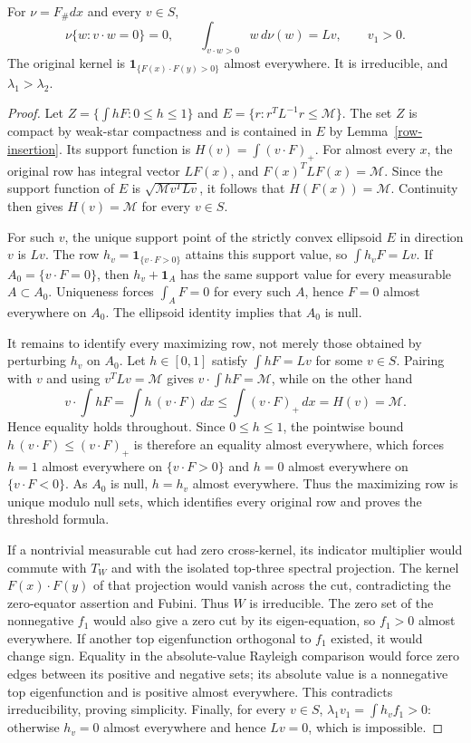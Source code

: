 \begin{lemma}\label{contact-structure}
For $\nu=F_\#dx$ and every $v\in S$,
\begin{equation}\label{all-rows}
 \nu\{w:v\cdot w=0\}=0,\qquad
 \int_{v\cdot w>0}w\,d\nu(w)=Lv,\qquad v_1>0.
\end{equation}
The original kernel is $\mathbf1_{\{F(x)\cdot F(y)>0\}}$ almost
everywhere. It is irreducible, and $\lambda_1>\lambda_2$.
\end{lemma}
\begin{proof}
Let $Z=\{\int hF:0\le h\le1\}$ and
$E=\{r:r^TL^{-1}r\le\mathcal M\}$. The set $Z$ is compact by weak-star
compactness and is contained in $E$ by Lemma~\ref{row-insertion}.
Its support function is $H(v)=\int(v\cdot F)_+$.
For almost every $x$, the original row has integral vector $LF(x)$,
and $F(x)^TLF(x)=\mathcal M$. Since the support function of $E$ is
$\sqrt{\mathcal M v^TLv}$, it follows that $H(F(x))=\mathcal M$.
Continuity then gives $H(v)=\mathcal M$ for every $v\in S$.

For such $v$, the unique support point of the strictly convex ellipsoid
$E$ in direction $v$ is $Lv$. The row $h_v=\mathbf1_{\{v\cdot F>0\}}$
attains this support value, so $\int h_vF=Lv$. If
$A_0=\{v\cdot F=0\}$, then $h_v+\mathbf1_A$ has the same support value
for every measurable $A\subset A_0$. Uniqueness forces $\int_A F=0$
for every such $A$, hence $F=0$ almost everywhere on $A_0$.
The ellipsoid identity implies that $A_0$ is null.

It remains to identify every maximizing row, not merely those obtained by
perturbing $h_v$ on $A_0$. Let $h\in[0,1]$ satisfy $\int hF=Lv$ for some
$v\in S$. Pairing with $v$ and using $v^TLv=\mathcal M$ gives
$v\cdot\int hF=\mathcal M$, while on the other hand
\[
 v\cdot\int hF=\int h\,(v\cdot F)\,dx\le\int(v\cdot F)_+\,dx=H(v)=\mathcal M .
\]
Hence equality holds throughout. Since $0\le h\le1$, the pointwise bound
$h\,(v\cdot F)\le(v\cdot F)_+$ is therefore an equality almost everywhere,
which forces $h=1$ almost everywhere on $\{v\cdot F>0\}$ and $h=0$ almost
everywhere on $\{v\cdot F<0\}$. As $A_0$ is null, $h=h_v$ almost
everywhere. Thus the maximizing row is unique modulo null sets, which
identifies every original row and proves the threshold formula.

If a nontrivial measurable cut had zero cross-kernel, its indicator
multiplier would commute with $T_W$ and with the isolated top-three
spectral projection. The kernel $F(x)\cdot F(y)$ of that projection
would vanish across the cut, contradicting the zero-equator assertion
and Fubini. Thus $W$ is irreducible. The zero set of the nonnegative
$f_1$ would also give a zero cut by its eigen-equation, so $f_1>0$ almost
everywhere. If another top eigenfunction orthogonal to $f_1$ existed,
it would change sign. Equality in the absolute-value Rayleigh comparison
would force zero edges between its positive and negative sets; its
absolute value is a nonnegative top eigenfunction and is positive almost
everywhere. This contradicts irreducibility, proving simplicity.
Finally, for every $v\in S$, $\lambda_1v_1=\int h_vf_1>0$:
otherwise $h_v=0$ almost everywhere and hence $Lv=0$, which is impossible.
\end{proof}
